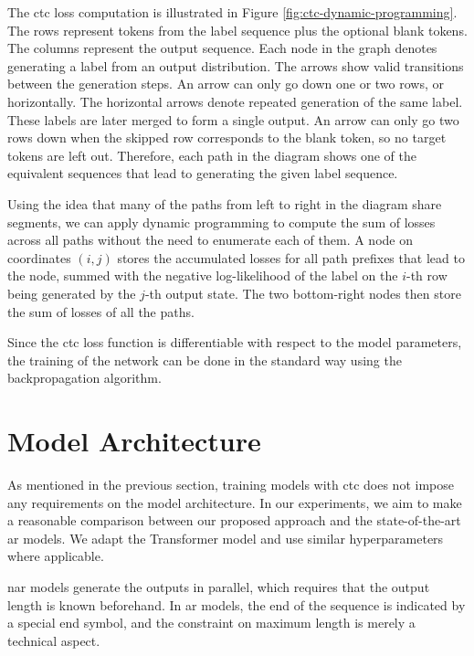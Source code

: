The \ac{ctc} loss computation is illustrated in Figure
\ref{fig:ctc-dynamic-programming}. The rows represent tokens from the label
sequence plus the optional blank tokens. The columns represent the output
sequence.  Each node in the graph denotes generating a label from an output
distribution. The arrows show valid transitions between the generation
steps. An arrow can only go down one or two rows, or horizontally.  The
horizontal arrows denote repeated generation of the same label. These labels
are later merged to form a single output. An arrow can only go two rows down
when the skipped row corresponds to the blank token, so no target tokens are
left out. Therefore, each path in the diagram shows one of the equivalent
sequences that lead to generating the given label sequence.

Using the idea that many of the paths from left to right in the diagram share
segments, we can apply dynamic programming to compute the sum of losses across
all paths without the need to enumerate each of them. A node on coordinates
$(i,j)$ stores the accumulated losses for all path prefixes that lead to the
node, summed with the negative log-likelihood of the label on the $i$-th row
being generated by the $j$-th output state. The two bottom-right nodes then
store the sum of losses of all the paths.

Since the \ac{ctc} loss function is differentiable with respect to the model
parameters, the training of the network can be done in the standard way using
the backpropagation algorithm.


\section{Model Architecture}
\label{sec:ctc:arch}

As mentioned in the previous section, training models with \ac{ctc} does not
impose any requirements on the model architecture. In our experiments, we aim
to make a reasonable comparison between our proposed approach and the
state-of-the-art \acl{ar} models. We adapt the Transformer model and use
similar hyperparameters where applicable.

\Acl{nar} models generate the outputs in parallel, which requires that the
output length is known beforehand. In \acl{ar} models, the end of the sequence
is indicated by a special end symbol, and the constraint on maximum length is
merely a technical aspect.

